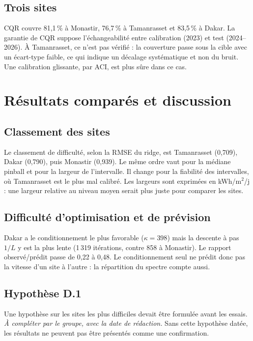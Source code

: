 \documentclass[11pt,a4paper]{article}
\theoremstyle{remark}
\theoremstyle{definition}
\begin{document}
\subsection{Trois sites}
CQR couvre 81,1\,\% à Monastir, 76,7\,\% à Tamanrasset et 83,5\,\% à Dakar. La garantie de CQR suppose l'échangeabilité entre calibration (2023) et test (2024--2026).
À Tamanrasset, ce n'est pas vérifié : la couverture passe sous la cible avec un écart-type faible, ce qui indique un décalage systématique et non du bruit.
Une calibration glissante, par ACI, est plus sûre dans ce cas.

\section{Résultats comparés et discussion}\label{sec:disc}
\subsection{Classement des sites}\label{sec:classement}
Le classement de difficulté, selon la RMSE du ridge, est Tamanrasset (0,709), Dakar (0,790), puis Monastir (0,939). Le même ordre vaut pour la médiane pinball et pour la largeur de l'intervalle.
Il change pour la fiabilité des intervalles, où Tamanrasset est le plus mal calibré. Les largeurs sont exprimées en kWh/m$^2$/j : une largeur relative au niveau moyen serait plus juste pour comparer les sites.

\subsection{Difficulté d'optimisation et de prévision}
Dakar a le conditionnement le plus favorable ($\kappa = 398$) mais la descente à pas $1/L$ y est la plus lente (1\,319 itérations, contre 858 à Monastir).
Le rapport observé/prédit passe de 0,22 à 0,48. Le conditionnement seul ne prédit donc pas la vitesse d'un site à l'autre : la répartition du spectre compte aussi.

\subsection{Hypothèse D.1}
Une hypothèse sur les sites les plus difficiles devait être formulée avant les essais. \textit{À compléter par le groupe, avec la date de rédaction.} Sans cette hypothèse datée, les résultats ne peuvent pas être présentés comme une confirmation.
\end{document}
